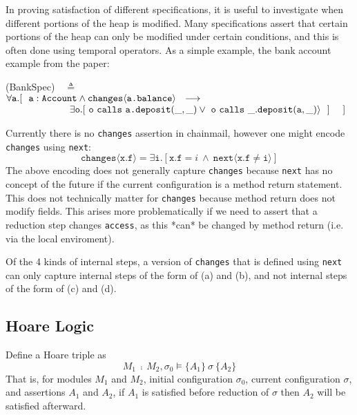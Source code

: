 \documentclass[12pt]{article}
\begin{document}
In proving satisfaction of different specifications, it is useful to investigate when different portions of the heap is modified.
Many specifications assert that certain portions of the heap can only be modified under certain conditions, and this is often 
done using temporal operators. As a simple example, the bank account example from the paper:
 
  \vspace{.01in}
(BankSpec)\ \  $\triangleq$\\ 
$\forall \texttt{a}.[\ \ \texttt{a}:\texttt{Account} \wedge \texttt{changes}\langle{\texttt{a.balance}}\rangle  \ \    
    \longrightarrow \ \    \hfill$ \\
  $\strut \hspace{2.3cm} 
  \exists \texttt{o}. [\    \texttt{o}\ \texttt{calls}\ {\texttt{a.}}{\texttt{deposit}}({\_,\_}) \vee\  \texttt{o}\ \texttt{calls}\ {\_.}{\texttt{deposit}}({\texttt{a},\_})\rangle\  \ ] \ \ \ \ ] \hfill $
\vspace{.05in}

Currently there is no \texttt{changes} assertion in  chainmail, however one might encode \texttt{changes} using \texttt{next}:
$$\texttt{changes}\langle \texttt{x.f} \rangle = \exists \texttt{i}. [\texttt{x.f} = i\ \wedge\ \texttt{next}\langle \texttt{x.f}\neq \texttt{i} \rangle]$$
The above encoding does not generally capture \texttt{changes} because \texttt{next} has no concept of the future if 
the current configuration is a method return statement. This does not technically matter for \texttt{changes} because 
method return does not modify fields. This arises more problematically if we need to assert that a reduction step 
changes \texttt{access}, as this *can* be changed by method return (i.e. via the local enviroment).

Of the 4 kinds of internal steps, a version of \texttt{changes} that is defined using \texttt{next} can only 
capture internal steps of the form of (a) and (b), and not internal steps of the form of (c) and (d).

\subsection{Hoare Logic}
Define a Hoare triple as 
$$M_1\ \fcmp\ M_	2, \sigma_0 \vDash \{A_1\}\ \sigma\ \{ A_2\}$$
That is, for modules $M_1$ and $M_2$, initial configuration $\sigma_0$, current configuration $\sigma$, and assertions $A_1$ and $A_2$, 
if $A_1$ is satisfied before reduction of $\sigma$ then $A_2$ will be satisfied afterward.
\end{document}
